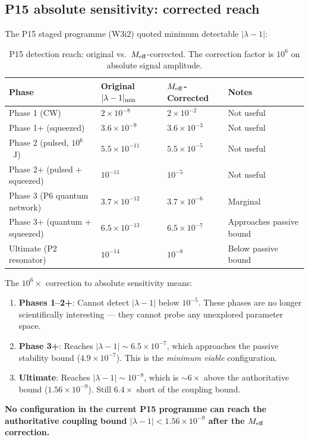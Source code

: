 \documentclass[11pt]{article}
\newcommand{\ee}[1]{\times 10^{#1}}
\newcommand{\lambdaone}{|\lambda-1|}
\newcommand{\lambdabound}{1.56\ee{-9}}
\begin{document}
\subsection{P15 absolute sensitivity: corrected reach}

The P15 staged programme (W3i2) quoted minimum detectable $\lambdaone$:

\begin{table}[h!]
\centering
\caption{P15 detection reach: original vs.\ $M_{\rm eff}$-corrected.
The correction factor is $10^6$ on absolute signal amplitude.}
\label{tab:P15-corrected}
\begin{tabular}{llll}
\toprule
Phase & Original $\lambdaone_{\rm min}$ & $M_{\rm eff}$-Corrected & Notes \\
\midrule
Phase 1 (CW) & $2\ee{-8}$ & $2\ee{-2}$ & Not useful \\
Phase 1+ (squeezed) & $3.6\ee{-9}$ & $3.6\ee{-3}$ & Not useful \\
Phase 2 (pulsed, $10^6$~J) & $5.5\ee{-11}$ & $5.5\ee{-5}$ & Not useful \\
Phase 2+ (pulsed + squeezed) & $10^{-11}$ & $10^{-5}$ & Not useful \\
Phase 3 (P6 quantum network) & $3.7\ee{-12}$ & $3.7\ee{-6}$ & Marginal \\
Phase 3+ (quantum + squeezed) & $6.5\ee{-13}$ & $6.5\ee{-7}$ & Approaches passive bound \\
Ultimate (P2 resonator) & $10^{-14}$ & $10^{-8}$ & Below passive bound \\
\bottomrule
\end{tabular}
\end{table}

\begin{tcolorbox}[colback=red!5!white, colframe=red!60!black,
  title=\textbf{CRITICAL: $M_{\rm eff}$ Correction Devastates Near-Term Detection}]
The $10^6\times$ correction to absolute sensitivity means:
\begin{enumerate}[nosep]
  \item \textbf{Phases 1--2+}: Cannot detect $\lambdaone$ below $10^{-5}$.
    These phases are no longer scientifically interesting --- they cannot
    probe any unexplored parameter space.
  \item \textbf{Phase 3+}: Reaches $\lambdaone \sim 6.5\ee{-7}$, which
    approaches the passive stability bound ($4.9\ee{-7}$). This is the
    \emph{minimum viable} configuration.
  \item \textbf{Ultimate}: Reaches $\lambdaone \sim 10^{-8}$, which is
    $\sim 6\times$ above the authoritative bound ($\lambdabound$). Still
    $6.4\times$ short of the coupling bound.
\end{enumerate}

\textbf{No configuration in the current P15 programme can reach the
authoritative coupling bound $\lambdaone < \lambdabound$ after the
$M_{\rm eff}$ correction.}
\end{tcolorbox}
\end{document}

